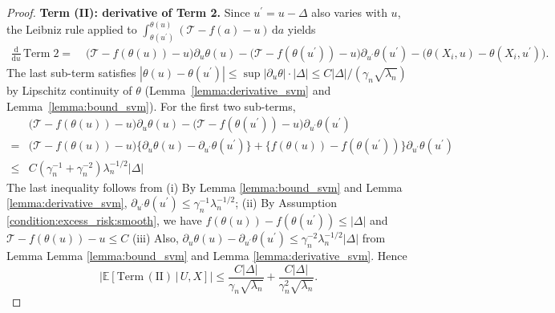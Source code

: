 \documentclass[12pt]{article}
\newcommand{\E}{\mathbb{E}}
\begin{document}
\begin{proof}
\noindent\textbf{Term (II): derivative of Term 2.}
Since $u^\prime=u-\Delta$ also varies with $u$, the Leibniz rule applied to $\int_{\theta(u^\prime)}^{\theta(u)}(\mathcal{T}-f(a)-u)\,\mathrm{d}a$ yields
\begin{align*}
\frac{\mathrm{d}}{\mathrm{d}u}\,\mathrm{Term\;2}
=\;&\bigl(\mathcal{T}-f(\theta(u))-u\bigr)\partial_u\theta(u)
-\bigl(\mathcal{T}-f(\theta(u^\prime))-u\bigr)\partial_{u^\prime}\theta(u^\prime)
-\bigl(\theta(X_i,u)-\theta(X_i,u^\prime)\bigr).
\end{align*}
The last sub-term satisfies $|\theta(u)-\theta(u^\prime)|\leq\sup|\partial_u\theta|\cdot|\Delta|\leq C|\Delta|/(\gamma_n\sqrt{\lambda_n})$ by Lipschitz continuity of $\theta$ (Lemma~\ref{lemma:derivative_svm} and Lemma~\ref{lemma:bound_svm}). For the first two sub-terms, 
\begin{align*}
    & \bigl(\mathcal{T}-f(\theta(u))-u\bigr)\partial_u\theta(u)
-\bigl(\mathcal{T}-f(\theta(u^\prime))-u\bigr)\partial_{u^\prime}\theta(u^\prime)\\
= & \bigl(\mathcal{T}-f(\theta(u))-u\bigr)\{\partial_u\theta(u) - \partial_{u^\prime}\theta(u^\prime)\}+ \{f(\theta(u)) - f(\theta(u^\prime))\}\partial_{u^\prime}\theta(u^\prime)\\
\leq & C(\gamma_n^{-1}+\gamma_n^{-2})\lambda_n^{-1/2}|\Delta|
\end{align*}
The last inequality follows from (i) By Lemma \ref{lemma:bound_svm} and Lemma \ref{lemma:derivative_svm}, $\partial_{u^\prime}\theta(u^\prime)\leq \gamma_n^{-1}\lambda_n^{-1/2}$; (ii) By Assumption \ref{condition:excess_risk:smooth}, we have $f(\theta(u)) - f(\theta(u^\prime))\leq |\Delta|$ and $\mathcal{T}-f(\theta(u))-u\leq C$ (iii) Also, $\partial_u\theta(u) - \partial_{u^\prime}\theta(u^\prime)\leq \gamma_n^{-2}\lambda_n^{-1/2}|\Delta|$ from Lemma Lemma \ref{lemma:bound_svm} and Lemma \ref{lemma:derivative_svm}. Hence
$$\left|\E\!\left[\mathrm{Term\,(II)}\,\big|\,U,X\right]\right|\leq\frac{C|\Delta|}{\gamma_n\sqrt{\lambda_n}}+\frac{C|\Delta|}{\gamma_n^2\sqrt{\lambda_n}}.$$


\end{proof}
\end{document}

